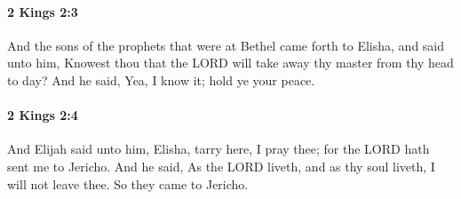 		\paragraph{2 Kings 2:3} %
			\label{2KINGS-2-3}

			And the sons of the prophets that were at Bethel came forth to Elisha, and said unto him, Knowest thou that the LORD will take away thy master from thy head to day? And he said, Yea, I know it; hold ye your peace.


		\paragraph{2 Kings 2:4} %
			\label{2KINGS-2-4}

			And Elijah said unto him, Elisha, tarry here, I pray thee; for the LORD hath sent me to Jericho. And he said, As the LORD liveth, and as thy soul liveth, I will not leave thee. So they came to Jericho.

